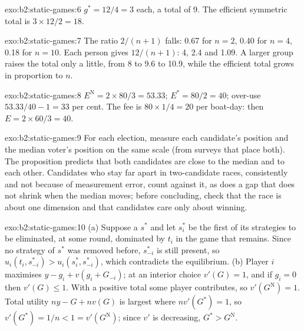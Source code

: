 \begin{solution}{exo:b2:static-games:6}
$g^* = 12/4 = 3$ each, a total of 9. The efficient symmetric total is $3 \times 12/2 = 18$.
\end{solution}

\begin{solution}{exo:b2:static-games:7}
The ratio $2/(n + 1)$ falls: 0.67 for $n = 2$, 0.40 for $n = 4$, 0.18 for $n = 10$. Each person gives $12/(n + 1)$: 4, 2.4 and
1.09. A larger group raises the total only a little, from 8 to 9.6 to 10.9, while the efficient total grows in
proportion to $n$.
\end{solution}

\begin{solution}{exo:b2:static-games:8}
$E^{\mathrm{N}} = 2 \times 80/3 = 53.33$; $E^* = 80/2 = 40$; over-use $53.33/40 - 1 = 33$ per cent. The fee is $80 \times 1/4 = 20$ per
boat-day: then $E = 2 \times 60/3 = 40$.
\end{solution}

\begin{solution}{exo:b2:static-games:9}
For each election, measure each candidate's position and the median voter's position on the same scale (from
surveys that place both). The proposition predicts that both candidates are close to the median and to each
other. Candidates who stay far apart in two-candidate races, consistently and not because of measurement
error, count against it, as does a gap that does not shrink when the median moves; before concluding, check
that the race is about one dimension and that candidates care only about winning.
\end{solution}

\begin{solution}{exo:b2:static-games:10}
(a) Suppose a  $s^*$ and let $s^*_i$ be the first of its strategies to be eliminated, at some
round, dominated by $t_i$ in the game that remains. Since no strategy of $s^*$ was removed before, $s^*_{-i}$ is
still present, so $u_i(t_i, s^*_{-i}) > u_i(s^*_i, s^*_{-i})$, which contradicts the equilibrium. (b) Player $i$
maximises $y - g_i + v(g_i + G_{-i})$; at an interior choice $v'(G) = 1$, and if $g_i = 0$ then $v'(G) \le 1$. With a positive
total some player contributes, so $v'(G^{\mathrm{N}}) = 1$. Total utility $ny - G + nv(G)$ is largest where $nv'(G^*) = 1$,
so $v'(G^*) = 1/n < 1 = v'(G^{\mathrm{N}})$; since $v'$ is decreasing, $G^* > G^{\mathrm{N}}$.
\end{solution}

